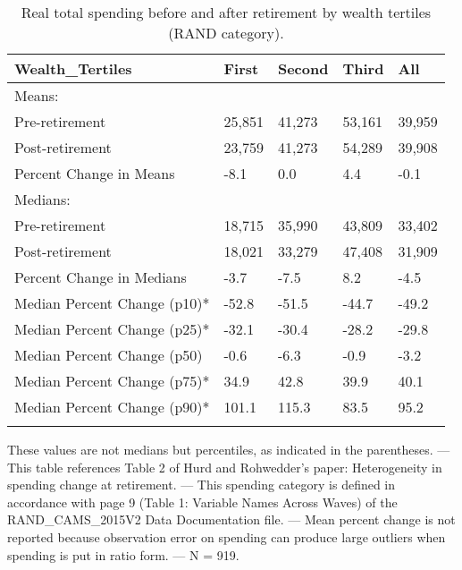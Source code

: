 \begin{table}[tbp] \centering
{}

\caption{Real total spending before and after retirement by wealth tertiles (RAND category).}
\begin{tabularx}{\textwidth}{lCCCC}

\toprule
{Wealth\_Tertiles}&{First}&{Second}&{Third}&{All} \tabularnewline
\midrule\addlinespace[1.5ex]
Means:&&&& \tabularnewline
\midrule Pre-retirement&25,851&41,273&53,161&39,959 \tabularnewline
Post-retirement&23,759&41,273&54,289&39,908 \tabularnewline
Percent Change in Means&-8.1&0.0&4.4&-0.1 \tabularnewline
\midrule Medians:&&&& \tabularnewline
\midrule Pre-retirement&18,715&35,990&43,809&33,402 \tabularnewline
Post-retirement&18,021&33,279&47,408&31,909 \tabularnewline
Percent Change in Medians&-3.7&-7.5&8.2&-4.5 \tabularnewline
Median Percent Change (p10)*&-52.8&-51.5&-44.7&-49.2 \tabularnewline
Median Percent Change (p25)*&-32.1&-30.4&-28.2&-29.8 \tabularnewline
Median Percent Change (p50)&-0.6&-6.3&-0.9&-3.2 \tabularnewline
Median Percent Change (p75)*&34.9&42.8&39.9&40.1 \tabularnewline
Median Percent Change (p90)*&101.1&115.3&83.5&95.2 \tabularnewline
\bottomrule \addlinespace[1.5ex]

\end{tabularx}
\begin{flushleft}
\footnotesize *These values are not medians but percentiles, as indicated in the parentheses. \linebreak --- \linebreak This table references Table 2 of Hurd and Rohwedder's paper: Heterogeneity in spending change at retirement. \linebreak --- \linebreak This spending category is defined in accordance with page 9 (Table 1: Variable Names Across Waves) of the RAND\_CAMS\_2015V2 Data Documentation file. \linebreak --- \linebreak Mean percent change is not reported because observation error on spending can produce large outliers when spending is put in ratio form. \linebreak --- \linebreak N = 919.
\end{flushleft}
\end{table}
